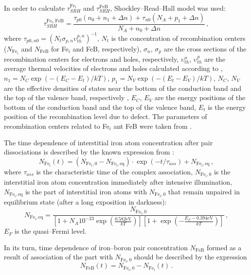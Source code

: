 \documentclass[sn-mathphys]{sn-jnl}%
\theoremstyle{thmstyleone}%
\theoremstyle{thmstyletwo}%
\theoremstyle{thmstylethree}%
\begin{document}
In order to calculate $\tau_{SRH}^{\mathrm{Fe_i}}$  and $\tau_{SRH}^\mathrm{FeB}$,
Shockley--Read--Hall model was used:
\begin{equation}
\label{eqTauSRH}
\tau_{SRH}^{\mathrm{Fe_i,FeB}}=\frac{\tau_{p0}(n_0+n_1+\Delta n)+\tau_{n0}(N_A+p_1+\Delta n)}
                             {N_A+n_0+\Delta n}\,,
\end{equation}
where
$\tau_{p0,n0}=(N_t \sigma_{p,n}\upsilon_{th}^{p,n})^{-1}$,
$N_t$ is the concentration of recombination centers
($N_\mathrm{Fe_i}$ and $N_\mathrm{FeB}$ for Fe$_i$ and FeB, respectively),
$\sigma_n$, $\sigma_p$  are the cross sections of the recombination centers for electrons and holes, respectively,
$\upsilon_{th}^{n}$, $\upsilon_{th}^{p}$ are the average thermal velocities of electrons and holes calculated according to \cite{Nc:Green},
$n_1=N_C \exp(-(E_C-E_t)/kT)$,
$p_1=N_V \exp(-(E_t-E_V)/kT)$,
$N_C$, $N_V$ are the effective densities of states near the bottom of the conduction band
and the top of the valence band, respectively \cite{Si_ni_Couderc},
$E_C$, $E_V$ are the energy positions of the bottom of the conduction band and
the top of the valence band,
$E_t$ is the energy position of the recombination level due to defect.
The parameters of recombination centers related to Fe$_i$ ant FeB were taken from \cite{ROUGIEUX2018}.

The time dependence of interstitial iron atom concentration
after pair dissociations is described by the known expression from \cite{MurphyJAP2011}:
\begin{equation}
\label{eqNFet}
N_\mathrm{Fe_i}(t)=(N_\mathrm{Fe_i,0}-N_\mathrm{Fe_i,eq})\cdot
\exp(-t/\tau_{ass})+N_\mathrm{Fe_i,eq}\,,
\end{equation}
where
$\tau_{ass}$ is the characteristic time of the complex association,
$N_\mathrm{Fe_i,0}$ is the interstitial iron atom concentration
immediately after intensive illumination,
$N_\mathrm{Fe_i,eq}$ is the part of interstitial iron atoms with $N_\mathrm{Fe_i,0}$
that remain unpaired in equilibrium state (after a long exposition in darkness)\cite{FeB:kinetic}:
\begin{equation}
\label{eqNFeeq}
N_\mathrm{Fe_i,eq}=\frac{N_\mathrm{Fe_i,0}}
   {\left[1+N_A 10^{-23}\exp\left(\frac{0.582\mathrm{eV}}{kT}\right)\right]
    \left[1+\exp\left(-\frac{E_F-0.394\mathrm{eV}}{kT}\right)\right]}\,,
\end{equation}
$E_F$ is the quasi--Fermi level.

In its turn, time dependence of iron--boron pair concentration
$N_\mathrm{FeB}$ formed as a result of association of the part with $N_\mathrm{Fe_i,0}$
should be described by the expression
\begin{equation}
\label{eqNFeBt}
N_\mathrm{FeB}(t)=N_\mathrm{Fe_i,0}-N_\mathrm{Fe_i}(t)\,.
\end{equation}
\end{document}
